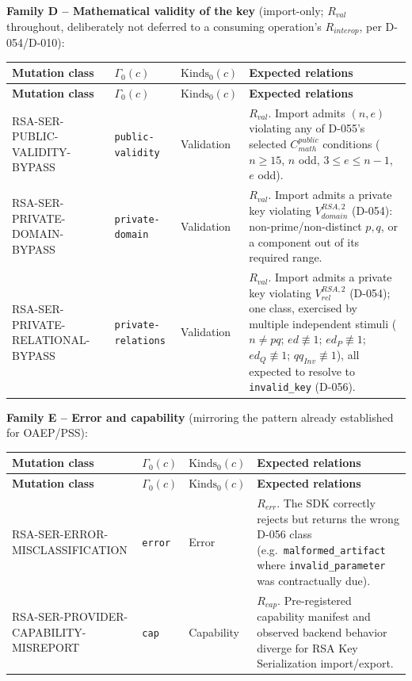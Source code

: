 \documentclass[11pt,a4paper]{article}
\begin{document}
\textbf{Family D -- Mathematical validity of the key} (import-only; $R_{val}$ throughout, deliberately not deferred to a consuming operation's $R_{interop}$, per D-054/D-010):
\begin{longtable}{p{}p{}p{}p{}}
\toprule
\textbf{Mutation class} & \textbf{$\Gamma_0(c)$} & \textbf{$\text{Kinds}_0(c)$} & \textbf{Expected relations}\\
\midrule\endfirsthead
\toprule
\textbf{Mutation class} & \textbf{$\Gamma_0(c)$} & \textbf{$\text{Kinds}_0(c)$} & \textbf{Expected relations}\\
\midrule\endhead
RSA-SER-PUBLIC-VALIDITY-BYPASS & \texttt{public-validity} & Validation & $R_{val}$. Import admits $(n,e)$ violating any of D-055's selected $C_{math}^{public}$ conditions ($n\ge15$, $n$ odd, $3\le e\le n-1$, $e$ odd).\\
RSA-SER-PRIVATE-DOMAIN-BYPASS & \texttt{private-domain} & Validation & $R_{val}$. Import admits a private key violating $V_{domain}^{RSA,2}$ (D-054): non-prime/non-distinct $p,q$, or a component out of its required range.\\
RSA-SER-PRIVATE-RELATIONAL-BYPASS & \texttt{private-relations} & Validation & $R_{val}$. Import admits a private key violating $V_{rel}^{RSA,2}$ (D-054); one class, exercised by multiple independent stimuli ($n\neq pq$; $ed\not\equiv1$; $ed_P\not\equiv1$; $ed_Q\not\equiv1$; $qq_{Inv}\not\equiv1$), all expected to resolve to \texttt{invalid\_key} (D-056).\\
\end{longtable}

\textbf{Family E -- Error and capability} (mirroring the pattern already established for OAEP/PSS):
\begin{longtable}{p{}p{}p{}p{}}
\toprule
\textbf{Mutation class} & \textbf{$\Gamma_0(c)$} & \textbf{$\text{Kinds}_0(c)$} & \textbf{Expected relations}\\
\midrule\endfirsthead
\toprule
\textbf{Mutation class} & \textbf{$\Gamma_0(c)$} & \textbf{$\text{Kinds}_0(c)$} & \textbf{Expected relations}\\
\midrule\endhead
RSA-SER-ERROR-MISCLASSIFICATION & \texttt{error} & Error & $R_{err}$. The SDK correctly rejects but returns the wrong D-056 class (e.g.\ \texttt{malformed\_artifact} where \texttt{invalid\_parameter} was contractually due).\\
RSA-SER-PROVIDER-CAPABILITY-MISREPORT & \texttt{cap} & Capability & $R_{cap}$. Pre-registered capability manifest and observed backend behavior diverge for RSA Key Serialization import/export.\\
\end{longtable}
\end{document}
